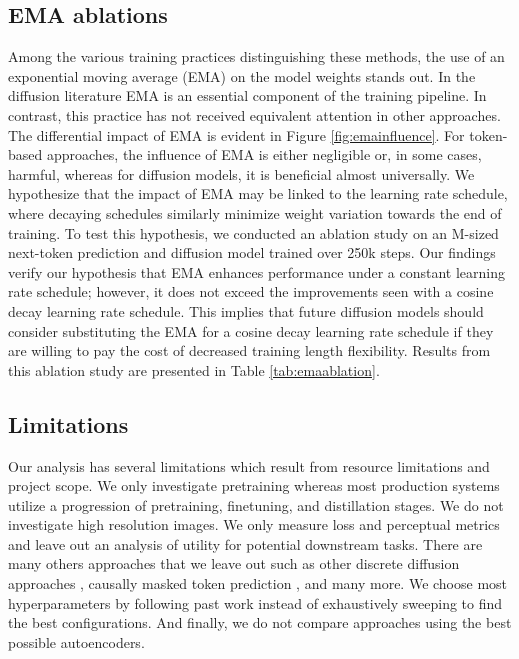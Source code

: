 \subsection{EMA ablations}
Among the various training practices distinguishing these methods, the use of an exponential moving average (EMA) on the model weights stands out. In the diffusion literature \citep{karras2024analyzing, karras2022elucidating, peebles2023scalable, esser2024scaling} EMA is an essential component of the training pipeline. In contrast, this practice has not received equivalent attention in other approaches. The differential impact of EMA is evident in Figure \ref{fig:emainfluence}. For token-based approaches, the influence of EMA is either negligible or, in some cases, harmful, whereas for diffusion models, it is beneficial almost universally. We hypothesize that the impact of EMA may be linked to the learning rate schedule, where decaying schedules similarly minimize weight variation towards the end of training. To test this hypothesis, we conducted an ablation study on an M-sized next-token prediction and diffusion model trained over 250k steps. Our findings verify our hypothesis that EMA enhances performance under a constant learning rate schedule; however, it does not exceed the improvements seen with a cosine decay learning rate schedule. This implies that future diffusion models should consider substituting the EMA for a cosine decay learning rate schedule if they are willing to pay the cost of decreased training length flexibility. Results from this ablation study are presented in Table \ref{tab:emaablation}. 

\emainfluence
\emaablation

\subsection{Limitations}
\label{sec:limitations}

Our analysis has several limitations which result from resource limitations and project scope. We only investigate pretraining whereas most production systems utilize a progression of pretraining, finetuning, and distillation stages. We do not investigate high resolution images. We only measure loss and perceptual metrics and leave out an analysis of utility for potential downstream tasks. There are many others approaches that we leave out such as other discrete diffusion approaches \citep{austin2023structured, pernias2023wuerstchen}, causally masked token prediction \citep{aghajanyan2022cm3}, and many more. We choose most hyperparameters by following past work instead of exhaustively sweeping to find the best configurations. And finally, we do not compare approaches using the best possible autoencoders.

